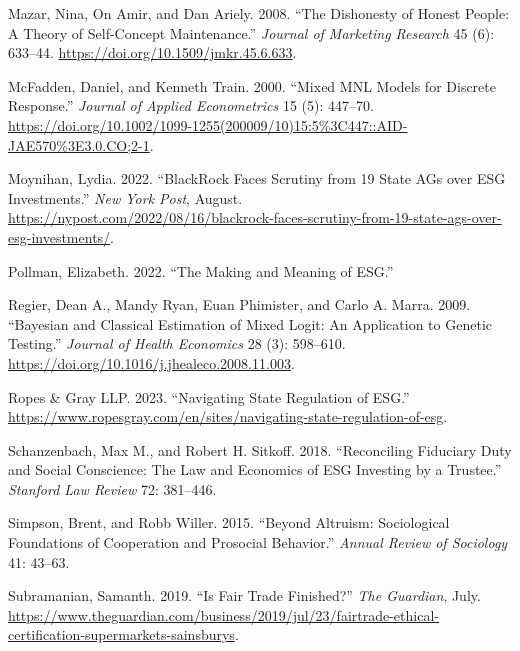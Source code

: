 \documentclass[
  12pt,
]{article}
\newlength{\cslhangindent}
\newlength{\cslentryspacingunit} %
\newenvironment{CSLReferences}[2] %
 {%
  \setlength{\parindent}{0pt}
  \ifodd #1
  \let\oldpar\par
  \def\par{\hangindent=\cslhangindent\oldpar}
  \fi
  \setlength{\parskip}{#2\cslentryspacingunit}
 }%
 {}
\begin{document}
\begin{CSLReferences}{1}{0}
\leavevmode{}%
Mazar, Nina, On Amir, and Dan Ariely. 2008. {``The Dishonesty of Honest People: A Theory of Self-Concept Maintenance.''} \emph{Journal of Marketing Research} 45 (6): 633--44. \url{https://doi.org/10.1509/jmkr.45.6.633}.

\leavevmode{}%
McFadden, Daniel, and Kenneth Train. 2000. {``Mixed MNL Models for Discrete Response.''} \emph{Journal of Applied Econometrics} 15 (5): 447--70. \url{https://doi.org/10.1002/1099-1255(200009/10)15:5\%3C447::AID-JAE570\%3E3.0.CO;2-1}.

\leavevmode{}%
Moynihan, Lydia. 2022. {``BlackRock Faces Scrutiny from 19 State AGs over ESG Investments.''} \emph{New York Post}, August. \url{https://nypost.com/2022/08/16/blackrock-faces-scrutiny-from-19-state-ags-over-esg-investments/}.

\leavevmode{}%
Pollman, Elizabeth. 2022. {``The Making and Meaning of ESG.''}

\leavevmode{}%
Regier, Dean A., Mandy Ryan, Euan Phimister, and Carlo A. Marra. 2009. {``Bayesian and Classical Estimation of Mixed Logit: An Application to Genetic Testing.''} \emph{Journal of Health Economics} 28 (3): 598--610. \url{https://doi.org/10.1016/j.jhealeco.2008.11.003}.

\leavevmode{}%
Ropes \& Gray LLP. 2023. {``Navigating State Regulation of ESG.''} \url{https://www.ropesgray.com/en/sites/navigating-state-regulation-of-esg}.

\leavevmode{}%
Schanzenbach, Max M., and Robert H. Sitkoff. 2018. {``Reconciling Fiduciary Duty and Social Conscience: The Law and Economics of ESG Investing by a Trustee.''} \emph{Stanford Law Review} 72: 381--446.

\leavevmode{}%
Simpson, Brent, and Robb Willer. 2015. {``Beyond Altruism: Sociological Foundations of Cooperation and Prosocial Behavior.''} \emph{Annual Review of Sociology} 41: 43--63.

\leavevmode{}%
Subramanian, Samanth. 2019. {``Is Fair Trade Finished?''} \emph{The Guardian}, July. \url{https://www.theguardian.com/business/2019/jul/23/fairtrade-ethical-certification-supermarkets-sainsburys}.


\end{CSLReferences}
\end{document}
